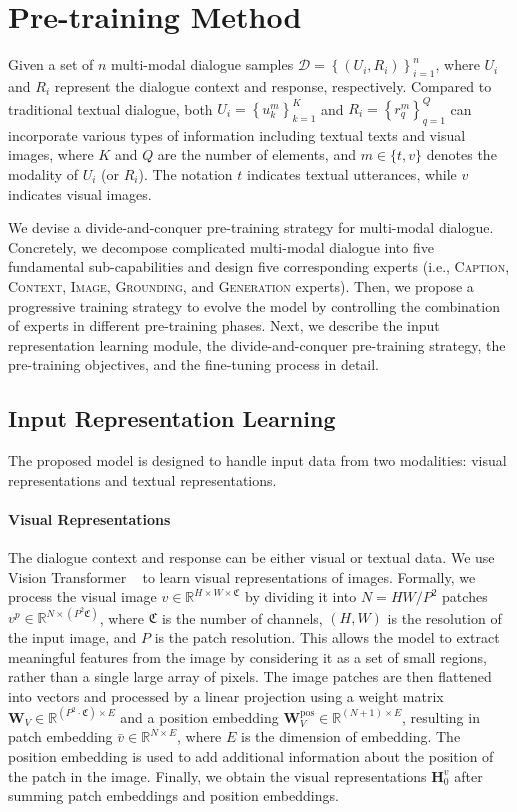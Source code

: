 \documentclass[11pt]{article}
\begin{document}
\section{Pre-training Method}
Given a set of $n$ multi-modal dialogue samples $\mathcal{D}=\left\{\left(U_i, R_i\right)\right\}_{i=1}^n$, where $U_i$ and $R_i$ represent the dialogue context and response, respectively.
Compared to traditional textual dialogue, both $U_i=\left\{u_k^m\right\}_{k=1}^K$ and $R_i=\left\{r_q^m\right\}_{q=1}^Q$ can incorporate various types of information including textual texts and visual images, where $K$ and $Q$ are the number of elements, and $m \in \{t, v\}$ denotes the modality of  $U_i$ (or $R_i$). The notation $t$ indicates textual utterances, while $v$ indicates visual images.

We devise a divide-and-conquer pre-training strategy for multi-modal dialogue. Concretely, we decompose complicated multi-modal dialogue into five fundamental sub-capabilities and design five corresponding experts (i.e., \textsc{Caption}, \textsc{Context}, \textsc{Image}, \textsc{Grounding}, and \textsc{Generation} experts). Then, we propose a progressive training strategy to evolve the model by controlling the combination of experts in different pre-training phases. 
Next, we describe the input representation learning module, the divide-and-conquer pre-training strategy, the pre-training objectives, and the fine-tuning process in detail.


\subsection{Input Representation Learning}
The proposed model is designed to handle input data from two modalities: visual representations and textual representations. 


\paragraph{Visual Representations}
The dialogue context and response can be either visual or textual data. 
We use Vision Transformer ~\citep{dosovitskiy2020image} to learn visual representations of images. Formally, we process the visual image ${v}\in \mathbb{R}^{H \times W \times \mathfrak{C}}$ by dividing it into $N=H W / P^2$ patches ${v}^p \in \mathbb{R}^{N \times\left(P^2 \mathfrak{C}\right)}$, where $\mathfrak{C}$ is the number of channels, $(H, W)$ is the resolution of the input image, and $P$ is the patch resolution. This allows the model to extract meaningful features from the image by considering it as a set of small regions, rather than a single large array of pixels. The image patches are then flattened into vectors and processed by a linear projection using a weight matrix $\mathbf{W}_{V} \in \mathbb{R}^{\left(P^2 \cdot \mathfrak{C}\right) \times E}$ and a position embedding $\mathbf{W}_{V}^{\text{pos}} \in \mathbb{R}^{(N+1) \times E}$, resulting in patch embedding $\bar{v} \in \mathbb{R}^{N \times E}$, where $E$ is the dimension of embedding. 
The position embedding is used to add additional information about the position of the patch in the image. 
Finally, we obtain the visual representations $\boldsymbol{H}_0^v$ after summing patch embeddings and position embeddings.
\end{document}
